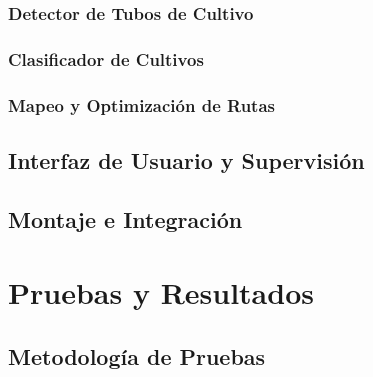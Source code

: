 \documentclass[a4paper,12pt]{report}
\begin{document}
\subsection{Detector de Tubos de Cultivo}




\subsection{Clasificador de Cultivos}



\subsection{Mapeo y Optimización de Rutas}



\section{Interfaz de Usuario y Supervisión}





\section{Montaje e Integración}





\chapter{Pruebas y Resultados}

\section{Metodología de Pruebas}


\end{document}

